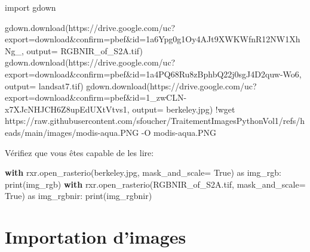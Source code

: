 \documentclass[
  11pt,
  letterpaper,
  open=any,
  twoside=false,
  french]{scrbook}
\newenvironment{Shaded}{\begin{snugshade}}{\end{snugshade}}
\newcommand{\BuiltInTok}[1]{\textcolor[rgb]{0.00,0.23,0.31}{#1}}
\newcommand{\ControlFlowTok}[1]{\textcolor[rgb]{0.00,0.23,0.31}{\textbf{#1}}}
\newcommand{\ImportTok}[1]{\textcolor[rgb]{0.00,0.46,0.62}{#1}}
\newcommand{\NormalTok}[1]{\textcolor[rgb]{0.00,0.23,0.31}{#1}}
\newcommand{\OperatorTok}[1]{\textcolor[rgb]{0.37,0.37,0.37}{#1}}
\newcommand{\StringTok}[1]{\textcolor[rgb]{0.13,0.47,0.30}{#1}}
\newcommand{\VariableTok}[1]{\textcolor[rgb]{0.07,0.07,0.07}{#1}}
\begin{document}
\begin{Shaded}
\begin{Highlighting}[]
\ImportTok{import}\NormalTok{ gdown}

\NormalTok{gdown.download(}\StringTok{\textquotesingle{}https://drive.google.com/uc?export=download\&confirm=pbef\&id=1a6Ypg0g1Oy4AJt9XWKWfnR12NW1XhNg\_\textquotesingle{}}\NormalTok{, output}\OperatorTok{=} \StringTok{\textquotesingle{}RGBNIR\_of\_S2A.tif\textquotesingle{}}\NormalTok{)}
\NormalTok{gdown.download(}\StringTok{\textquotesingle{}https://drive.google.com/uc?export=download\&confirm=pbef\&id=1a4PQ68Ru8zBphbQ22j0sgJ4D2quw{-}Wo6\textquotesingle{}}\NormalTok{, output}\OperatorTok{=} \StringTok{\textquotesingle{}landsat7.tif\textquotesingle{}}\NormalTok{)}
\NormalTok{gdown.download(}\StringTok{\textquotesingle{}https://drive.google.com/uc?export=download\&confirm=pbef\&id=1\_zwCLN{-}x7XJcNHJCH6Z8upEdUXtVtvs1\textquotesingle{}}\NormalTok{, output}\OperatorTok{=} \StringTok{\textquotesingle{}berkeley.jpg\textquotesingle{}}\NormalTok{)}
\OperatorTok{!}\NormalTok{wget https:}\OperatorTok{//}\NormalTok{raw.githubusercontent.com}\OperatorTok{/}\NormalTok{sfoucher}\OperatorTok{/}\NormalTok{TraitementImagesPythonVol1}\OperatorTok{/}\NormalTok{refs}\OperatorTok{/}\NormalTok{heads}\OperatorTok{/}\NormalTok{main}\OperatorTok{/}\NormalTok{images}\OperatorTok{/}\NormalTok{modis}\OperatorTok{{-}}\NormalTok{aqua.PNG }\OperatorTok{{-}}\NormalTok{O modis}\OperatorTok{{-}}\NormalTok{aqua.PNG}
\end{Highlighting}
\end{Shaded}

Vérifiez que vous êtes capable de les lire:

\begin{Shaded}
\begin{Highlighting}[]
\ControlFlowTok{with}\NormalTok{ rxr.open\_rasterio(}\StringTok{\textquotesingle{}berkeley.jpg\textquotesingle{}}\NormalTok{, mask\_and\_scale}\OperatorTok{=} \VariableTok{True}\NormalTok{) }\ImportTok{as}\NormalTok{ img\_rgb:}
    \BuiltInTok{print}\NormalTok{(img\_rgb)}
\ControlFlowTok{with}\NormalTok{ rxr.open\_rasterio(}\StringTok{\textquotesingle{}RGBNIR\_of\_S2A.tif\textquotesingle{}}\NormalTok{, mask\_and\_scale}\OperatorTok{=} \VariableTok{True}\NormalTok{) }\ImportTok{as}\NormalTok{ img\_rgbnir:}
    \BuiltInTok{print}\NormalTok{(img\_rgbnir)}
\end{Highlighting}
\end{Shaded}

\section{Importation d'images}\label{importation-dimages}
\end{document}

